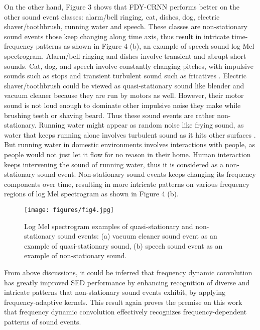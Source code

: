 \documentclass[a4paper]{article}
\begin{document}
On the other hand, Figure 3 shows that FDY-CRNN performs better on the other sound event classes: alarm/bell ringing, cat, dishes, dog, electric shaver/toothbrush, running water and speech. These classes are non-stationary sound events those keep changing along time axis, thus result in intricate time-frequency patterns as shown in Figure 4 (b), an example of speech sound log Mel spectrogram. Alarm/bell ringing and dishes involve transient and abrupt short sounds. Cat, dog, and speech involve constantly changing pitches, with impulsive sounds such as stops and transient turbulent sound such as fricatives \cite{speechprocessing}. Electric shaver/toothbrush could be viewed as quasi-stationary sound like blender and vacuum cleaner because they are run by motors as well. However, their motor sound is not loud enough to dominate other impulsive noise they make while brushing teeth or shaving beard. Thus these sound events are rather non-stationary. Running water might appear as random noise like frying sound, as water that keeps running alone involves turbulent sound as it hits other surfaces \cite{randomdata}. But running water in domestic environments involves interactions with people, as people would not just let it flow for no reason in their home. Human interaction keeps intervening the sound of running water, thus it is considered as a non-stationary sound event. Non-stationary sound events keeps changing its frequency components over time, resulting in more intricate patterns on various frequency regions of log Mel spectrogram as shown in Figure 4 (b).

\begin{figure}[t]
\centerline{\texttt{[image: figures/fig4.jpg]}}
\vspace{-10pt}
\caption{Log Mel spectrogram examples of quasi-stationary and non-stationary sound events: (a) vacuum cleaner sound event as an example of quasi-stationary sound, (b) speech sound event as an example of non-stationary sound.}
\label{fig:vacuumspeech}
\vspace{-15pt}
\end{figure}

From above discussions, it could be inferred that frequency dynamic convolution has greatly improved SED performance by enhancing recognition of diverse and intricate patterns that non-stationary sound events exhibit, by applying frequency-adaptive kernels. This result again proves the premise on this work that frequency dynamic convolution effectively recognizes frequency-dependent patterns of sound events.
\end{document}
